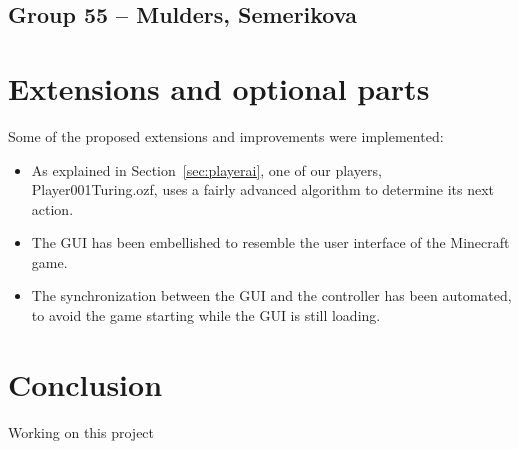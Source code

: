 \documentclass[12pt,journal]{IEEEtran}
\newcommand{\ntt}{\normalfont\ttfamily}
\newcommand{\fn}[1]{{\protect\ntt#1}}
\begin{document}
\subsection{Group 55 -- Mulders, Semerikova}

\section{Extensions and optional parts}
Some of the proposed extensions and improvements were implemented:
\begin{itemize}
	\item As explained in Section~\ref{sec:playerai}, one of our players,
	\fn{Player001Turing.ozf}, uses a fairly advanced algorithm to determine its next action.
	\item The GUI has been embellished to resemble the user interface of the Minecraft game.
	\item The synchronization between the GUI and the controller has been automated, to avoid the game starting while the GUI is still loading.
\end{itemize}

\section{Conclusion}
Working on this project

\end{document}
